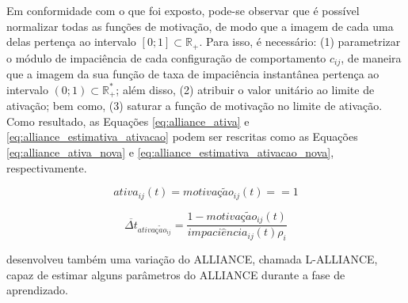     Em conformidade com o que foi exposto, pode-se observar que é possível normalizar todas as funções de motivação, de modo que a imagem de cada uma delas pertença ao intervalo $[0; 1] \subset \mathbb{R}_+$. Para isso, é necessário: (1) parametrizar o módulo de impaciência de cada configuração de comportamento $c_{ij}$, de maneira que a imagem da sua função de taxa de impaciência instantânea pertença ao intervalo $(0; 1) \subset \mathbb{R}_+^*$; além disso, (2) atribuir o valor unitário ao limite de ativação; bem como, (3) saturar a função de motivação no limite de ativação. Como resultado, as Equações \ref{eq:alliance_ativa} e \ref{eq:alliance_estimativa_ativacao} podem ser rescritas como as Equações \ref{eq:alliance_ativa_nova} e \ref{eq:alliance_estimativa_ativacao_nova}, respectivamente.
    
    \begin{equation} \label{eq:alliance_ativa_nova}
        ativa_{ij}(t) = motiva\textit{ç}\tilde{a}o_{ij}(t) == 1
    \end{equation}
    
    \begin{equation} \label{eq:alliance_estimativa_ativacao_nova}
        \overline{\Delta t}_{ativa\textit{ç}\tilde{a}o_{ij}} = \frac{1 - motiva\textit{ç}\tilde{a}o_{ij}(t)}{impaci\hat{e}ncia_{ij}(t) \rho_i}
    \end{equation}
    
     desenvolveu também uma variação do ALLIANCE, chamada L-ALLIANCE, capaz de estimar alguns parâmetros do ALLIANCE durante a fase de aprendizado.